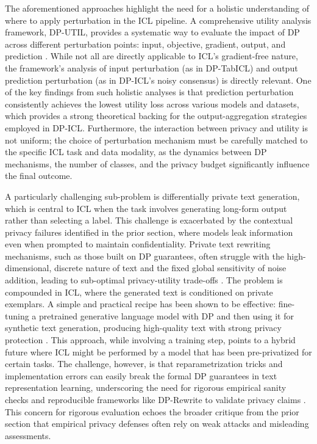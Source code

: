 \documentclass[11pt]{article}
\begin{document}
The aforementioned approaches highlight the need for a holistic understanding of where to apply perturbation in the ICL pipeline. A comprehensive utility analysis framework, DP-UTIL, provides a systematic way to evaluate the impact of DP across different perturbation points: input, objective, gradient, output, and prediction \cite{ref456}. While not all are directly applicable to ICL's gradient-free nature, the framework's analysis of input perturbation (as in DP-TabICL) and output prediction perturbation (as in DP-ICL's noisy consensus) is directly relevant. One of the key findings from such holistic analyses is that prediction perturbation consistently achieves the lowest utility loss across various models and datasets, which provides a strong theoretical backing for the output-aggregation strategies employed in DP-ICL. Furthermore, the interaction between privacy and utility is not uniform; the choice of perturbation mechanism must be carefully matched to the specific ICL task and data modality, as the dynamics between DP mechanisms, the number of classes, and the privacy budget significantly influence the final outcome.

A particularly challenging sub-problem is differentially private text generation, which is central to ICL when the task involves generating long-form output rather than selecting a label. This challenge is exacerbated by the contextual privacy failures identified in the prior section, where models leak information even when prompted to maintain confidentiality. Private text rewriting mechanisms, such as those built on DP guarantees, often struggle with the high-dimensional, discrete nature of text and the fixed global sensitivity of noise addition, leading to sub-optimal privacy-utility trade-offs \cite{ref457}. The problem is compounded in ICL, where the generated text is conditioned on private exemplars. A simple and practical recipe has been shown to be effective: fine-tuning a pretrained generative language model with DP and then using it for synthetic text generation, producing high-quality text with strong privacy protection \cite{ref458}. This approach, while involving a training step, points to a hybrid future where ICL might be performed by a model that has been pre-privatized for certain tasks. The challenge, however, is that reparametrization tricks and implementation errors can easily break the formal DP guarantees in text representation learning, underscoring the need for rigorous empirical sanity checks and reproducible frameworks like DP-Rewrite to validate privacy claims \cite{ref459,ref460}. This concern for rigorous evaluation echoes the broader critique from the prior section that empirical privacy defenses often rely on weak attacks and misleading assessments.
\end{document}
